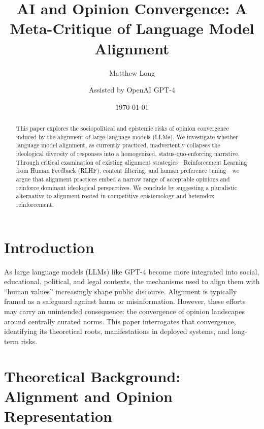 \documentclass[11pt]{article}
\title{AI and Opinion Convergence: A Meta-Critique of Language Model Alignment}
\author[1]{Matthew Long}
\author[2]{Assisted by OpenAI GPT-4}
\affil[1]{Yoneda AI Research Lab}
\affil[2]{Language Modeling Division, OpenAI}
\date{\today}
\begin{document}
\maketitle

\begin{abstract}
This paper explores the sociopolitical and epistemic risks of opinion convergence induced by the alignment of large language models (LLMs). We investigate whether language model alignment, as currently practiced, inadvertently collapses the ideological diversity of responses into a homogenized, status-quo-enforcing narrative. Through critical examination of existing alignment strategies—Reinforcement Learning from Human Feedback (RLHF), content filtering, and human preference tuning—we argue that alignment practices embed a narrow range of acceptable opinions and reinforce dominant ideological perspectives. We conclude by suggesting a pluralistic alternative to alignment rooted in competitive epistemology and heterodox reinforcement.
\end{abstract}


\section{Introduction}

As large language models (LLMs) like GPT-4 become more integrated into social, educational, political, and legal contexts, the mechanisms used to align them with “human values” increasingly shape public discourse. Alignment is typically framed as a safeguard against harm or misinformation. However, these efforts may carry an unintended consequence: the convergence of opinion landscapes around centrally curated norms. This paper interrogates that convergence, identifying its theoretical roots, manifestations in deployed systems, and long-term risks.

\section{Theoretical Background: Alignment and Opinion Representation}
\end{document}
